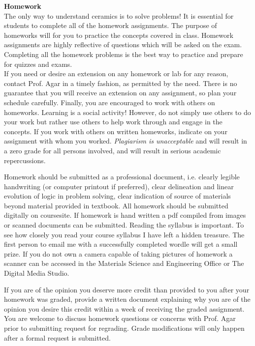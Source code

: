 \documentclass[11pt,letterpaper]{article}
\newcommand{\lefthead}[2]{\noindent\textbf{#1}\hfill\\[#2]}
\begin{document}
\lefthead{Homework}{0.3cm}
\noindent The only way to understand ceramics is to solve problems! It is essential for students to complete all of the homework assignments. The purpose of homeworks will for you to practice the concepts covered in class. Homework assignments are highly reflective of questions which will be asked on the exam. Completing all the homework problems is the best way to practice and prepare for quizzes and exams. \\
If you need or desire an extension on any homework or lab for any reason, contact Prof. Agar in a timely fashion, as permitted by the need. There is no guarantee that you will receive an extension on any assignment, so plan your schedule carefully. Finally, you are encouraged to work with others on homeworks. Learning is a social activity! However, do not simply use others to do your work but rather use others to help work through and engage in the concepts. If you work with others on written homeworks, indicate on your assignment with whom you worked. \emph{Plagiarism is unacceptable} and will result in a zero grade for all persons involved, and will result in serious academic repercussions. 

Homework should be submitted as a professional document, i.e. clearly legible handwriting (or computer printout if preferred), clear delineation and linear evolution of logic in problem solving,
clear indication of source of materials beyond material provided in textbook.
All homework should be submitted digitally on coursesite. 
If homework is hand written a pdf compiled from images or scanned documents can be submitted. 
Reading the syllabus is important. To see how closely you read your course syllabus I have left a hidden treasure. The first person to email me with a successfully completed wordle will get a small prize.
If you do not own a camera capable of taking pictures of homework a scanner can be accessed in the Materials Science and Engineering Office or The Digital Media Studio.

If you are of the opinion you deserve more credit than provided to you after your homework was graded, provide a written document explaining why you are of the opinion you desire this credit within a week of receiving the graded assignment. You are welcome to discuss homework questions or concerns with Prof. Agar prior to submitting request for regrading. Grade modifications will only happen after a formal request is submitted. 
\\[0.3cm]
\end{document}
